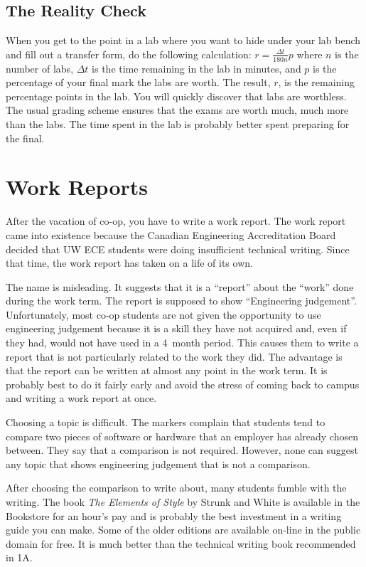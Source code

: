 \documentclass{book}
\begin{document}
\section{The Reality Check}
When you get to the point in a lab where you want to hide under your lab bench and fill out a transfer form, do the following calculation: $r = \frac{\Delta t}{180n}p$ where $n$ is the number of labs, $\Delta t$ is the time remaining in the lab in minutes, and $p$ is the percentage of your final mark the labs are worth. The result, $r$, is the remaining percentage points in the lab. You will quickly discover that labs are worthless. The usual grading scheme ensures that the exams are worth much, much more than the labs. The time spent in the lab is probably better spent preparing for the final.

\chapter{Work Reports}
After the vacation of co-op, you have to write a work report. The work report came into existence because the Canadian Engineering Accreditation Board decided that UW ECE students were doing insufficient technical writing. Since that time, the work report has taken on a life of its own.

The name is misleading. It suggests that it is a ``report'' about the ``work'' done during the work term. The report is supposed to show ``Engineering judgement''. Unfortunately, most co-op students are not given the opportunity to use engineering judgement because it is a skill they have not acquired and, even if they had, would not have used in a 4~month period. This causes them to write a report that is not particularly related to the work they did. The advantage is that the report can be written at almost any point in the work term. It is probably best to do it fairly early and avoid the stress of coming back to campus and writing a work report at once.

Choosing a topic is difficult. The markers complain that students tend to compare two pieces of software or hardware that an employer has already chosen between. They say that a comparison is not required. However, none can suggest any topic that shows engineering judgement that is not a comparison.

After choosing the comparison to write about, many students fumble with the writing. The book \textsl{The Elements of Style} by Strunk and White is available in the Bookstore for an hour's pay and is probably the best investment in a writing guide you can make. Some of the older editions are available on-line in the public domain for free. It is much better than the technical writing book recommended in 1A.
\end{document}
